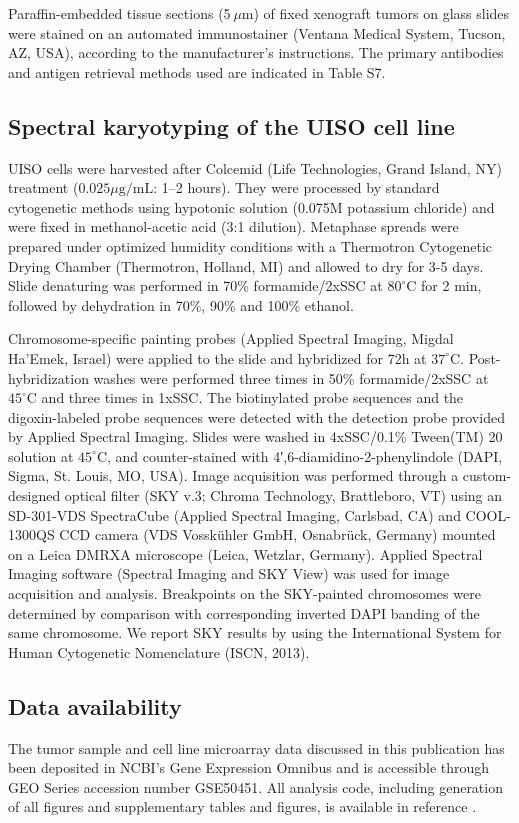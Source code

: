 \documentclass[10pt]{article}
\begin{document}
Paraffin-embedded tissue sections (5 $\mu\mathrm{m}$) of fixed xenograft tumors on glass slides were stained on an automated immunostainer (Ventana Medical System, Tucson, AZ, USA), according to the manufacturer's instructions.
The primary antibodies and antigen retrieval methods used are indicated in Table S7.

\subsection*{Spectral karyotyping of the UISO cell line}

UISO cells were harvested after Colcemid (Life Technologies, Grand Island, NY) treatment ($0.025 \mu\textrm{g/mL}$: 1–2 hours).
They were processed by standard cytogenetic methods using hypotonic solution (0.075M potassium chloride) and were fixed in methanol-acetic acid (3:1 dilution).
Metaphase spreads were prepared under optimized humidity conditions with a Thermotron Cytogenetic Drying Chamber (Thermotron, Holland, MI) and allowed to dry for 3-5 days.
Slide denaturing was performed in 70\% formamide/2xSSC at $80^{\circ}\mathrm{C}$ for 2 min, followed by dehydration in 70\%, 90\% and 100\% ethanol.

Chromosome-specific painting probes (Applied Spectral Imaging, Migdal Ha’Emek, Israel) were applied to the slide and hybridized for 72h at $37^{\circ}\mathrm{C}$.
Post-hybridization washes were performed three times in 50\% formamide/2xSSC at $45^{\circ}\mathrm{C}$ and three times in 1xSSC.
The biotinylated probe sequences and the digoxin-labeled probe sequences were detected with the detection probe provided by Applied Spectral Imaging.
Slides were washed in 4xSSC/0.1\% Tween(TM) 20 solution at $45^{\circ}\mathrm{C}$, and counter-stained with 4′,6-diamidino-2-phenylindole (DAPI, Sigma, St. Louis, MO, USA).
Image acquisition was performed through a custom-designed optical filter (SKY v.3; Chroma Technology, Brattleboro, VT) using an SD-301-VDS SpectraCube (Applied Spectral Imaging, Carlsbad, CA) and COOL-1300QS CCD camera (VDS Vosskühler GmbH, Osnabrück, Germany) mounted on a Leica DMRXA microscope (Leica, Wetzlar, Germany).
Applied Spectral Imaging software (Spectral Imaging and SKY View) was used for image acquisition and analysis.
Breakpoints on the SKY-painted chromosomes were determined by comparison with corresponding inverted DAPI banding of the same chromosome.
We report SKY results by using the International System for Human Cytogenetic Nomenclature (ISCN, 2013).

\subsection*{Data availability}
The tumor sample and cell line microarray data discussed in this publication has been deposited in NCBI's Gene Expression Omnibus \citep{Edgar2002Gene} and is accessible through GEO Series accession number GSE50451.
All analysis code, including generation of all figures and supplementary tables and figures, is available in reference \cite{DailyUISOReproducible2014}. %



\end{document}
